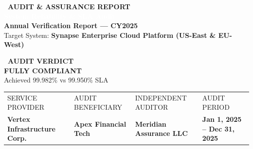 \documentclass[11pt,a4paper]{scrartcl}
\begin{document}

\begin{tcolorbox}[
    enhanced,
    colback=navyblue,
    colframe=navyblue,
    arc=4pt,
    boxrule=0pt,
    left=14pt, right=14pt, top=8pt, bottom=8pt
]
\begin{minipage}[t]{0.65\textwidth}
    \textcolor{tealaccent}{\small\textbf{\faLock\ AUDIT \& ASSURANCE REPORT}} \\[2pt]
    \textcolor{white}{\LARGE \textbf{System Reliability \& SLA Audit}} \\[2pt]
    \textcolor{cardborder}{\large \textbf{Annual Verification Report — CY2025}} \\[3pt]
    \textcolor{lightbg}{\small Target System: \textbf{Synapse Enterprise Cloud Platform (US-East \& EU-West)}}
\end{minipage}%
\hfill
\begin{minipage}[t]{0.31\textwidth}
    \raggedleft
    \begin{tcolorbox}[
        enhanced,
        colback=statusgreenbg,
        colframe=statusgreen,
        arc=3pt,
        boxrule=1pt,
        left=6pt, right=6pt, top=4pt, bottom=4pt
    ]
        \centering
        \textcolor{statusgreen}{\small\textbf{\faCheckCircle\ AUDIT VERDICT}} \\[2pt]
        \textcolor{statusgreen}{\large\textbf{FULLY COMPLIANT}} \\[1pt]
        \textcolor{statusgreen}{\tiny Achieved 99.982\% vs 99.950\% SLA}
    \end{tcolorbox}
\end{minipage}
\end{tcolorbox}

\vspace{-6pt}

\begin{tcolorbox}[
    enhanced,
    colback=cardbg,
    colframe=cardborder,
    arc=3pt,
    boxrule=0.5pt,
    left=10pt, right=10pt, top=4pt, bottom=4pt
]
\begin{tabularx}{\textwidth}{@{}X X X X@{}}
    \textcolor{textmuted}{\tiny SERVICE PROVIDER} & 
    \textcolor{textmuted}{\tiny AUDIT BENEFICIARY} & 
    \textcolor{textmuted}{\tiny INDEPENDENT AUDITOR} & 
    \textcolor{textmuted}{\tiny AUDIT PERIOD} \\
    \textbf{\small Vertex Infrastructure Corp.} & 
    \textbf{\small Apex Financial Tech} & 
    \textbf{\small Meridian Assurance LLC} & 
    \textbf{\small Jan 1, 2025 – Dec 31, 2025}
\end{tabularx}
\end{tcolorbox}
\end{document}
